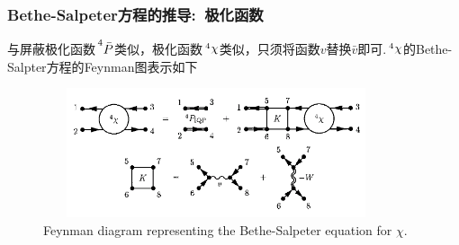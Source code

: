 \frame
{
	\frametitle{\textrm{Bethe-Salpeter}方程的推导:~极化函数}
	与屏蔽极化函数$\sideset{^4}{}{\mathop{\bar{P}}}$类似，极化函数$\sideset{^4}{}{\mathop{\chi}}$类似，只须将函数$v$替换$\bar{v}$即可.$\sideset{^4}{}{\mathop{\chi}}$的\textrm{Bethe-Salpter}方程的\textrm{Feynman}图表示如下
\begin{figure}[h!]
\centering
\includegraphics[height=1.5in,width=4.00in,viewport=13 15 633 260,clip]{Figures/BSE_Feynman.png}
\caption{\textrm{\tiny Feynman diagram representing the Bethe-Salpeter equation for $\chi$.}}%
\label{chi-BSE_solution}
\end{figure}
}

